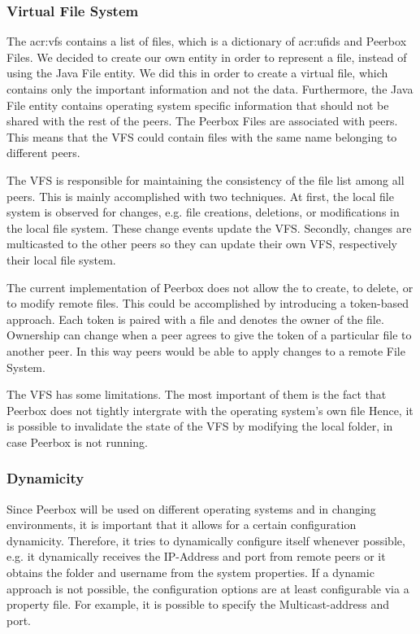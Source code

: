 \subsubsection{Virtual File System}
    
The \gls{acr:vfs} contains a list of files, which is a dictionary of \glspl{acr:ufid} and Peerbox Files. We decided to create our own entity in order to represent a file, instead of using the Java File entity. We did this in order to create a virtual file, which contains only the important information and not the data. Furthermore, the Java File entity contains operating system specific information that should not be shared with the rest of the peers. The Peerbox Files are associated with peers. This means that the VFS could contain files with the same name belonging to different peers.
    
The VFS is responsible for maintaining the consistency of the file list among all peers. This is mainly accomplished with two techniques. At first, the local file system is observed for changes, e.g. file creations, deletions, or modifications in the local file system. These change events update the VFS. Secondly, changes are multicasted to the other peers so they can  update their own VFS, respectively their local file system.

The current implementation of Peerbox does not allow the to create, to delete, or to modify  remote files. This could be accomplished by introducing a token-based approach. Each token is paired with a file and denotes the owner of the file. Ownership can change when a peer agrees to give the token of a particular file to another peer. In this way peers would be able to apply changes to a remote File System.

The VFS has some limitations. The most important of them is the fact that Peerbox does not tightly intergrate with the operating system's own file Hence, it is possible to invalidate the state of the VFS by modifying the local folder, in case  Peerbox is not running.

\subsubsection{Dynamicity}
Since Peerbox will be used on different operating systems and in changing environments, it is important that it allows for a certain configuration dynamicity. Therefore, it tries to dynamically configure itself whenever possible, e.g. it dynamically receives the IP-Address and port from remote peers or it obtains the folder and username from the system properties. If a dynamic approach is not possible, the configuration options are at least configurable via a property file. 
For example, it is possible to specify the Multicast-address and port.

